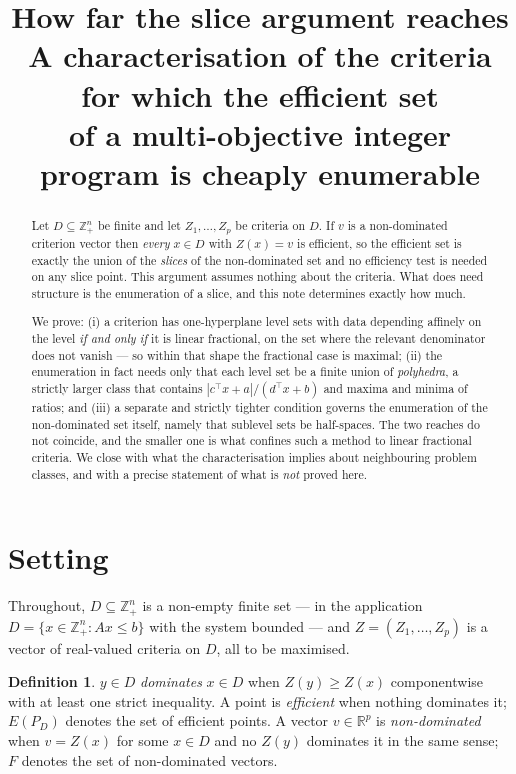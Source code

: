 \documentclass[11pt,a4paper]{article}
\title{\bfseries How far the slice argument reaches\\[4pt]
\large A characterisation of the criteria for which the efficient set\\
of a multi-objective integer program is cheaply enumerable}
\author{}
\date{}
\newcommand{\Dset}{D}
\newcommand{\E}{E(P_{\Dset})}
\newcommand{\Z}{Z}
\newcommand{\R}{\mathbb{R}}
\newcommand{\Zint}{\mathbb{Z}}
\theoremstyle{plain}
\theoremstyle{definition}
\newtheorem{definition}[theorem]{Definition}
\begin{document}
\maketitle

\begin{abstract}
\noindent
Let $\Dset \subseteq \Zint^n_+$ be finite and let $\Z_1,\dots,\Z_p$ be criteria
on $\Dset$.  If $v$ is a non-dominated criterion vector then \emph{every}
$x \in \Dset$ with $\Z(x) = v$ is efficient, so the efficient set is exactly
the union of the \emph{slices} of the non-dominated set and no efficiency test
is needed on any slice point.  This argument assumes nothing about the
criteria.  What does need structure is the enumeration of a slice, and this
note determines exactly how much.

We prove: (i) a criterion has one-hyperplane level sets with data depending
affinely on the level \emph{if and only if} it is linear fractional, on the set
where the relevant denominator does not vanish --- so within that shape the
fractional case is maximal; (ii) the enumeration in fact needs only that each
level set be a finite union of \emph{polyhedra}, a strictly larger class that
contains $|c^{\top}x+a|/(d^{\top}x+b)$ and maxima and minima of ratios; and
(iii) a separate and strictly tighter condition governs the enumeration of the
non-dominated set itself, namely that sublevel sets be half-spaces.  The two
reaches do not coincide, and the smaller one is what confines such a method to
linear fractional criteria.  We close with what the characterisation implies
about neighbouring problem classes, and with a precise statement of what is
\emph{not} proved here.
\end{abstract}

\section{Setting}

Throughout, $\Dset \subseteq \Zint^{n}_{+}$ is a non-empty finite set --- in
the application $\Dset = \{x \in \Zint^n_+ : Ax \leqslant b\}$ with the system
bounded --- and $\Z = (\Z_1,\dots,\Z_p)$ is a vector of real-valued criteria on
$\Dset$, all to be maximised.

\begin{definition}
$y \in \Dset$ \emph{dominates} $x \in \Dset$ when $\Z(y) \geqslant \Z(x)$
componentwise with at least one strict inequality.  A point is \emph{efficient}
when nothing dominates it; $\E$ denotes the set of efficient points.  A vector
$v \in \R^p$ is \emph{non-dominated} when $v = \Z(x)$ for some $x \in \Dset$
and no $\Z(y)$ dominates it in the same sense; $F$ denotes the set of
non-dominated vectors.
\end{definition}
\end{document}
